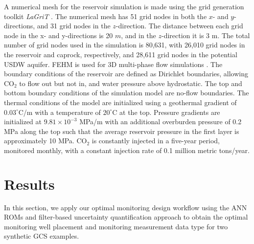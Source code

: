 \documentclass[a4paper,fleqn]{cas-sc}
\begin{document}
A numerical mesh for the reservoir simulation is made using the grid generation toolkit \textit{LaGriT} \citep{George1999}. The numerical mesh has 51 grid nodes in both the $x$- and $y$-directions, and 31 grid nodes in the $z$-direction. The distance between each grid node in the x- and y-directions is 20 $m$, and in the $z$-direction it is 3 m. The total number of grid nodes used in the simulation is 80,631, with 26,010 grid nodes in the reservoir and caprock, respectively, and 28,611 grid nodes in the potential USDW aquifer. FEHM is used for 3D multi-phase flow simulations \citep{Zyvoloski1997}. The boundary conditions of the reservoir are defined as Dirichlet boundaries, allowing CO$_2$ to flow out but not in, and water pressure above hydrostatic. The top and bottom boundary conditions of the simulation model are no-flow boundaries. The thermal conditions of the model are initialized using a geothermal gradient of $0.03^\circ$C/m with a temperature of $20^\circ$C at the top. Pressure gradients are initialized at $9.81\times10^{-3}$  MPa/m with an additional overburden pressure of 0.2 MPa along the top such that the average reservoir pressure in the first layer is approximately 10 MPa. CO$_2$ is constantly injected in a five-year period, monitored monthly, with a constant injection rate of 0.1 million metric tons/year.

\section{Results}
In this section, we apply our optimal monitoring design workflow using the ANN ROMs and filter-based uncertainty quantification approach to obtain the optimal monitoring well placement and monitoring measurement data type for two synthetic GCS examples.
\end{document}
